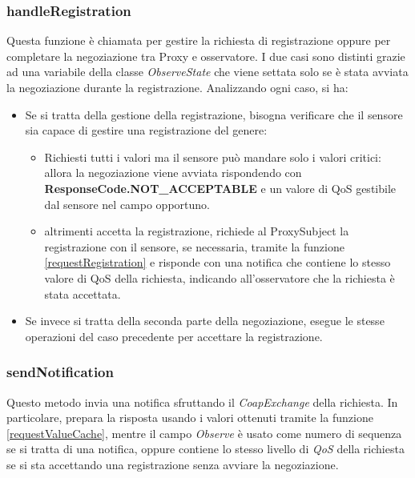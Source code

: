 			\subsubsection{handleRegistration}
				Questa funzione è chiamata per gestire la richiesta di registrazione oppure per completare la negoziazione tra Proxy e osservatore. I due casi sono distinti grazie ad una variabile della classe \textit{ObserveState} che viene settata solo se è stata avviata la negoziazione durante la registrazione. Analizzando ogni caso, si ha:
			  \begin{itemize}
			  	\item Se si tratta della gestione della registrazione, bisogna verificare che il sensore sia capace di gestire una registrazione del genere:
					 \begin{itemize}
						 \item Richiesti tutti i valori ma il sensore può mandare solo i valori critici: allora la negoziazione viene avviata rispondendo con \textbf{ResponseCode.NOT\_ACCEPTABLE} e un valore di QoS gestibile dal sensore nel campo opportuno.
						 \item altrimenti accetta la registrazione, richiede al ProxySubject la registrazione con il sensore, se necessaria, tramite la funzione \ref{requestRegistration} e risponde con una notifica che contiene lo stesso valore di QoS della richiesta, indicando all'osservatore che la richiesta è stata accettata.
					 \end{itemize}
					\item Se invece si tratta della seconda parte della negoziazione, esegue le stesse operazioni del caso precedente per accettare la registrazione.
			  \end{itemize}

			\subsubsection{sendNotification}
				Questo metodo invia una notifica sfruttando il \textit{CoapExchange} della richiesta. In particolare, prepara la risposta usando i valori ottenuti tramite la funzione \ref{requestValueCache}, mentre il campo \textit{Observe} è usato come numero di sequenza se si tratta di una notifica, oppure contiene lo stesso livello di \textit{QoS} della richiesta se si sta accettando una registrazione senza avviare la negoziazione.
